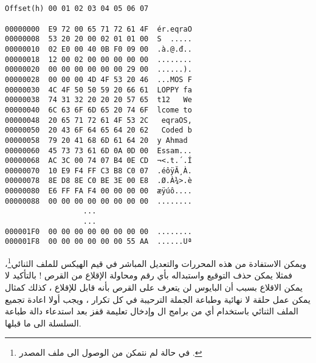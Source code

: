 \documentclass[document.tex]{subfiles}
\begin{document}
\begin{english}


\begin{lstlisting}[label=lst:bootloader_hex,caption=Hex value of bootloader]


Offset(h) 00 01 02 03 04 05 06 07

00000000  E9 72 00 65 71 72 61 4F  ér.eqraO
00000008  53 20 20 00 02 01 01 00  S  .....
00000010  02 E0 00 40 0B F0 09 00  .à.@.đ..
00000018  12 00 02 00 00 00 00 00  ........
00000020  00 00 00 00 00 00 29 00  ......).
00000028  00 00 00 4D 4F 53 20 46  ...MOS F
00000030  4C 4F 50 50 59 20 66 61  LOPPY fa
00000038  74 31 32 20 20 20 57 65  t12   We
00000040  6C 63 6F 6D 65 20 74 6F  lcome to
00000048  20 65 71 72 61 4F 53 2C   eqraOS,
00000050  20 43 6F 64 65 64 20 62   Coded b
00000058  79 20 41 68 6D 61 64 20  y Ahmad 
00000060  45 73 73 61 6D 0A 0D 00  Essam...
00000068  AC 3C 00 74 07 B4 0E CD  ¬<.t.´.Í
00000070  10 E9 F4 FF C3 B8 C0 07  .éôÿĂ¸À.
00000078  8E D8 8E C0 BE 3E 00 E8  .Ø.À¾>.è
00000080  E6 FF FA F4 00 00 00 00  æÿúô....
00000088  00 00 00 00 00 00 00 00  ........
                  ...
                  ...
000001F0  00 00 00 00 00 00 00 00  ........
000001F8  00 00 00 00 00 00 55 AA  ......Uª

\end{lstlisting}
\end{english}

ويمكن الاستفادة من هذه المحررات والتعديل المباشر في قيم الهيكس للملف الثنائي\footnote{في حالة لم نتمكن من الوصول الى ملف المصدر .}، فمثلا يمكن حذف التوقيع واستبداله بأي رقم ومحاولة الإقلاع من القرص ! بالتأكيد لا يمكن الاقلاع بسبب أن البايوس لن يتعرف على القرص بأنه قابل للإقلاع ، كذلك كمثال يمكن عمل حلقة لا نهائية وطباعة الجملة الترحيبة في كل تكرار ، ويجب أولا اعادة تجميع الملف الثنائي باستخدام أي من برامج ال  وإدخال تعليمة قفز بعد استدعاء دالة طباعة السلسلة الى ما قبلها.\\

\begin{english}
\lstset{numberstyle=\tiny,numbersep=5pt,tabsize=2,extendedchars=true,breaklines=true,frame=b,showspaces=false, showtabs=false,xleftmargin=10pt,framexleftmargin=10pt,framexrightmargin=5pt,framexbottommargin=4pt,showstringspaces=false,language=[x86masm]Assembler}


\end{english}
\end{document}
